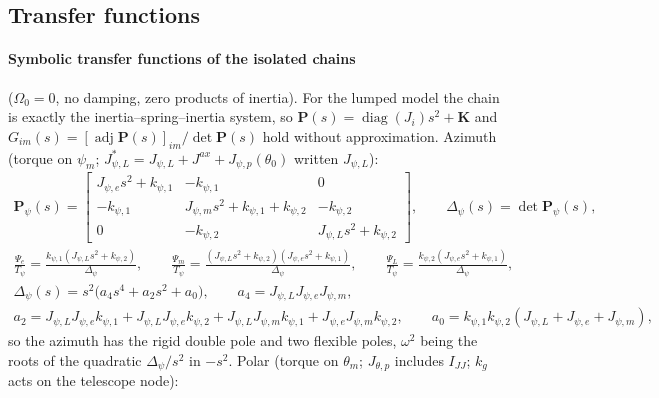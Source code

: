 \documentclass[10pt,a4paper]{article}
\numberwithin{equation}{section}
\begin{document}
\subsection{Transfer functions}\label{subsec:lump_tf}
\paragraph{Symbolic transfer functions of the isolated chains} ($\Omega_0 = 0$, no damping, zero products of inertia). For the lumped model the chain is exactly the inertia--spring--inertia system, so $\mathbf P(s) = \operatorname{diag}(J_i)s^2 + \mathbf K$ and $G_{im}(s) = [\operatorname{adj}\mathbf P(s)]_{im}/\det\mathbf P(s)$ hold without approximation. Azimuth (torque on $\psi_m$; $J_{\psi,L}^* = J_{\psi,L} + J^{ax} + J_{\psi,p}(\theta_0)$ written $J_{\psi,L}$):
\begin{gather}
\mathbf P_\psi(s) = \left[\begin{matrix}J_{\psi,e} s^{2} + k_{\psi,1} & - k_{\psi,1} & 0\\- k_{\psi,1} & J_{\psi,m} s^{2} + k_{\psi,1} + k_{\psi,2} & - k_{\psi,2}\\0 & - k_{\psi,2} & J_{\psi,L} s^{2} + k_{\psi,2}\end{matrix}\right],\qquad \Delta_\psi(s) = \det\mathbf P_\psi(s), \\
\frac{\Psi_e}{T_\psi} = \frac{k_{\psi,1} \left(J_{\psi,L} s^{2} + k_{\psi,2}\right)}{\Delta_\psi},\qquad \frac{\Psi_m}{T_\psi} = \frac{\left(J_{\psi,L} s^{2} + k_{\psi,2}\right) \left(J_{\psi,e} s^{2} + k_{\psi,1}\right)}{\Delta_\psi},\qquad \frac{\Psi_L}{T_\psi} = \frac{k_{\psi,2} \left(J_{\psi,e} s^{2} + k_{\psi,1}\right)}{\Delta_\psi},
\end{gather}
\begin{gather}
\Delta_\psi(s) = s^2\bigl(a_4 s^4 + a_2 s^2 + a_0\bigr),\qquad a_4 = J_{\psi,L} J_{\psi,e} J_{\psi,m}, \\
a_2 = J_{\psi,L} J_{\psi,e} k_{\psi,1} + J_{\psi,L} J_{\psi,e} k_{\psi,2} + J_{\psi,L} J_{\psi,m} k_{\psi,1} + J_{\psi,e} J_{\psi,m} k_{\psi,2},\qquad a_0 = k_{\psi,1} k_{\psi,2} \left(J_{\psi,L} + J_{\psi,e} + J_{\psi,m}\right),
\end{gather}
so the azimuth has the rigid double pole and two flexible poles, $\omega^2$ being the roots of the quadratic $\Delta_\psi/s^2$ in $-s^2$. Polar (torque on $\theta_m$; $J_{\theta,p}$ includes $I_{JJ}$; $k_g$ acts on the telescope node):
\begin{center}\end{center}
\end{document}
